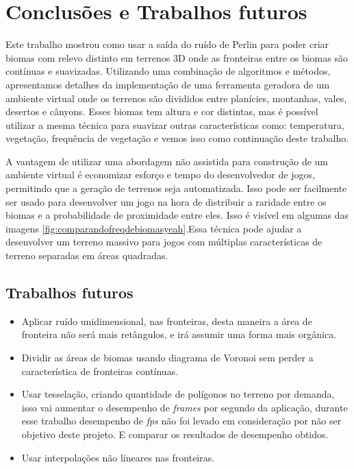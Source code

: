 \chapter{Conclusões e Trabalhos futuros}

Este trabalho mostrou como usar
a saída do ruído de Perlin para poder criar biomas com relevo distinto em terrenos 3D onde as fronteiras entre os biomas são contínuas e suavizadas.
Utilizando uma combinação de algoritmos e métodos, apresentamos detalhes da implementação de uma ferramenta geradora de um ambiente virtual onde os 
terrenos são divididos entre planícies, montanhas, vales, desertos e cânyons. 
Esses biomas tem altura e cor distintas, mas é possível utilizar a mesma técnica para suavizar
outras características como: temperatura, vegetação, frequência de vegetação e vemos isso como continuação deste trabalho. 

A vantagem de utilizar uma abordagem não assistida para construção de um ambiente virtual é economizar esforço e tempo do desenvolvedor de jogos,
permitindo que a geração de terrenos seja automatizada.  
Isso pode ser facilmente ser usado para desenvolver um jogo na hora de distribuir 
a raridade entre os biomas e a probabilidade de proximidade entre eles. Isso é visível em
algumas das imagens \ref{fig:comparandofreqdebiomasyeah}.Essa técnica pode ajudar a desenvolver um terreno massivo para jogos com
múltiplas características de terreno separadas em áreas quadradas.



\section{Trabalhos futuros}

\begin{itemize}
    \item Aplicar ruído unidimensional, nas fronteiras, desta maneira a área de fronteira
    não será mais retângulos, e irá assumir uma forma mais orgânica.
    \item Dividir as áreas de biomas usando diagrama de Voronoi sem perder a característica de fronteiras contínuas.
    \item Usar tesselação, criando quantidade de polígonos no terreno por demanda, 
    isso vai aumentar o desempenho de \textit{frames} por segundo da aplicação, durante esse trabalho 
    desempenho de \textit{fps} não foi levado em consideração por não ser objetivo deste projeto. E comparar os resultados de desempenho obtidos.
    \item Usar interpolações não lineares nas fronteiras.
    
\end{itemize}
